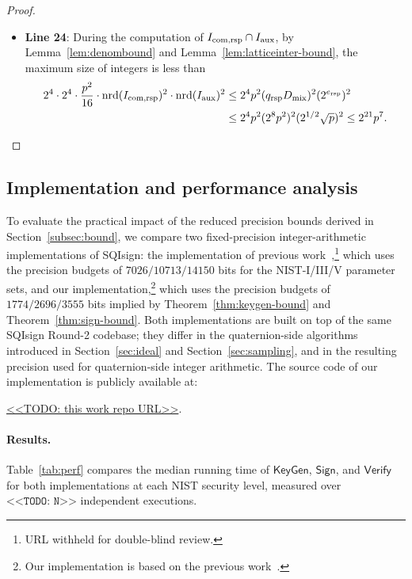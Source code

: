 \begin{proof}
\begin{itemize}
    \item\textbf{Line 24}: During the computation of $I_\text{com,rsp} \cap I_\text{aux}$, by Lemma~\ref{lem:denombound} and Lemma~\ref{lem:latticeinter-bound}, the maximum size of integers is less than
    \[\begin{aligned}
        2^4\cdot2^4\cdot\frac{p^2}{16}\cdot\mathrm{nrd}(I_\text{com,rsp})^2\cdot\mathrm{nrd}(I_\text{aux})^2
        &\le 2^4p^2(q_\text{rsp}D_\text{mix})^2(2^{e_\text{rsp}})^2\\
        &\le 2^4p^2(2^8p^2)^2(2^{1/2}\sqrt{p})^2
        \le 2^{21}p^7.
    \end{aligned}\]
\end{itemize}
\end{proof}


\subsection{Implementation and performance analysis}
\label{subsec:performance}

To evaluate the practical impact of the reduced precision bounds derived in
Section~\ref{subsec:bound}, we compare two fixed-precision integer-arithmetic
implementations of SQIsign: the implementation of previous work~\cite{KLKL25},\footnote{URL withheld for double-blind review.}
which uses the precision budgets of $7026/10713/14150$ bits for the
NIST-I/III/V parameter sets,
and our implementation,\footnote{Our implementation is based on the previous work~\cite{KLKL25}.} which uses the precision budgets of $1774/2696/3555$ bits implied by Theorem~\ref{thm:keygen-bound} and Theorem~\ref{thm:sign-bound}.
Both implementations are built on top of the same SQIsign Round-2 codebase;
they differ in the quaternion-side algorithms introduced in Section~\ref{sec:ideal} and Section~\ref{sec:sampling}, and in the resulting precision used for quaternion-side integer arithmetic.
The source code of our implementation is publicly available at:
\begin{center}
\url{<<TODO: this work repo URL>>}.
\end{center}

\paragraph{Results.}
Table~\ref{tab:perf} compares the median running time of $\textsf{KeyGen}$, $\textsf{Sign}$, and $\textsf{Verify}$ for both implementations at each NIST security level, measured over $\texttt{<<TODO: N>>}$ independent executions.

